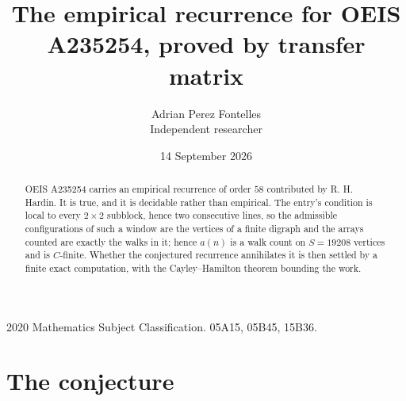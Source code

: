 \documentclass[11pt,a4paper]{article}
\title{The empirical recurrence for OEIS A235254, proved by transfer matrix}
\author{Adrian Perez Fontelles\\ \small Independent researcher}
\date{14 September 2026}
\theoremstyle{plain}
\theoremstyle{definition}
\begin{document}
\maketitle

\begin{abstract}
OEIS A235254 carries an empirical recurrence of order $58$ contributed by R. H. Hardin. It is
true, and it is decidable rather than empirical. The entry's condition is local to every $2\times2$ subblock, hence two consecutive lines, so
the admissible configurations of such a window are the vertices of a finite digraph and the
arrays counted are exactly the walks in it; hence $a(n)$ is a walk count on $S=19208$ vertices
and is $C$-finite. Whether the conjectured recurrence annihilates it is then settled by a
finite exact computation, with the Cayley--Hamilton theorem bounding the work.
\end{abstract}

\noindent\small 2020 Mathematics Subject Classification. 05A15, 05B45, 15B36.\normalsize

\section{The conjecture}
\end{document}
